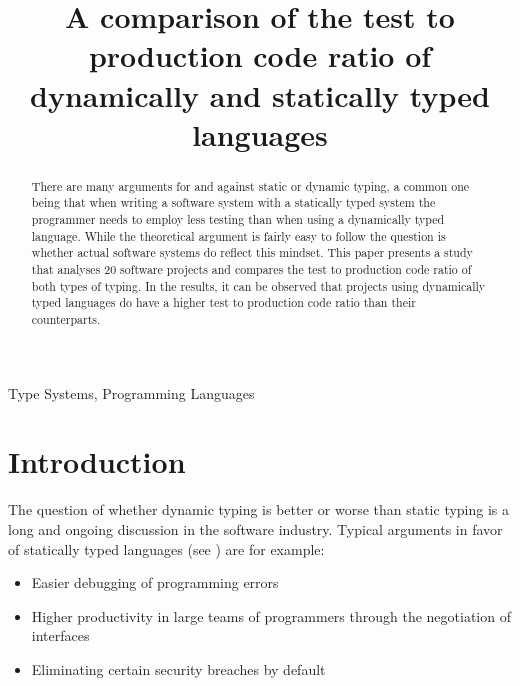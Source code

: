 \documentclass[conference]{IEEEtran}
\begin{document}
\title{A comparison of the test to production code ratio of dynamically and statically typed languages}

\author{
}

\maketitle

\begin{abstract}
There are many arguments for and against static or dynamic typing, a common one being that when writing a software system with a statically typed system the programmer needs to employ less testing than when using a dynamically typed language. While the theoretical argument is fairly easy to follow the question is whether actual software systems do reflect this mindset. This paper presents a study that analyses 20 software projects and compares the test to production code ratio of both types of typing. In the results, it can be observed that projects using dynamically typed languages do have a higher test to production code ratio than their counterparts.
\end{abstract}

\begin{IEEEkeywords}
Type Systems, Programming Languages
\end{IEEEkeywords}

\section{Introduction}

The question of whether dynamic typing is better or worse than static typing is a long and ongoing discussion in the software industry. Typical arguments in favor of statically typed languages (see \cite{cardelli_luca_type_systems}) are for example:

\begin{itemize}
    \item Easier debugging of programming errors
    \item Higher productivity in large teams of programmers through the negotiation of interfaces
    \item Eliminating certain security breaches by default
\end{itemize}
\end{document}
